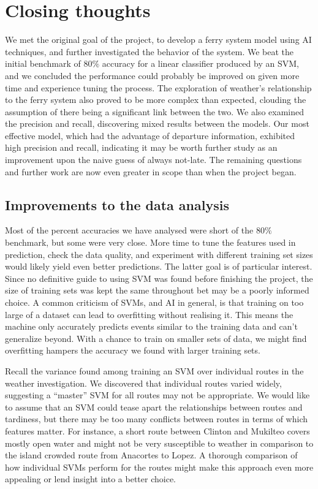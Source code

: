 \documentclass[11pt]{article} %
\begin{document}
\section{Closing thoughts}
\label{sec:summary}
We met the original goal of the project, to develop a ferry system model using AI 
techniques, and further investigated the behavior of the
system. We beat the initial benchmark of $80\%$ accuracy for a linear classifier 
produced by an SVM, and we concluded the performance could probably be improved
on given more time and experience tuning the process. The exploration of weather's
relationship to the ferry system also proved to be more complex than expected, 
clouding the assumption of there being a significant link between the two. We 
also examined the precision and recall, discovering mixed results between the 
models. Our most effective model, which had the advantage of departure information,
exhibited high precision and recall, indicating it may be worth further study
as an improvement upon the naive guess of always not-late. The remaining 
questions and further work are now even greater in scope than when the 
project began.

\subsection{Improvements to the data analysis}
\label{sec:improvements}
Most of the percent accuracies we have analysed were short of the $80\%$ benchmark,
but some were very close. More time to tune the features used in prediction, 
check the data quality, and experiment with different training set sizes would
likely yield even better predictions. The latter goal is of particular interest.
Since no definitive guide to using SVM was found before finishing the project, 
the size of training sets was kept the same throughout bet may be a poorly informed
choice. A common criticism of SVMs, and AI in general, is that training on too
large of a dataset can lead to overfitting without realising it. This means the
machine only accurately predicts events similar to the training data
and can't generalize beyond. With a chance to train on smaller sets of data,
we might find overfitting hampers the accuracy we found with larger training sets.

Recall the variance found among training an SVM over individual routes in the 
weather investigation. We discovered that individual routes varied widely, 
suggesting a 
``master'' SVM for all routes may not be appropriate. We would like to assume that
an SVM could tease apart the relationships between routes and tardiness, but there
may be too many conflicts between routes in terms of which features matter. For 
instance, a short route between Clinton and Mukilteo covers mostly open water
and might not be very susceptible to weather in comparison to the island crowded
route from Anacortes to Lopez. A thorough comparison of how individual SVMs 
perform for the routes might make this approach even more appealing or lend 
insight into a better choice.
\end{document}
